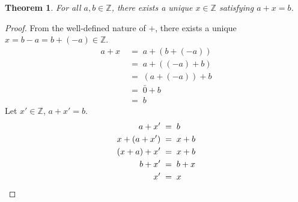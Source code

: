 \documentclass[10pt]{article}
\newtheorem{theorem}{Theorem}[section]
\theoremstyle{definition}
\theoremstyle{remark}
\newcommand{\Z}{\mathbb{Z}}
\begin{document}
        \begin{theorem}
                        For all $a, b \in \Z$, there exists a unique $x \in \Z$ satisfying $a + x = b$.
        \end{theorem}
        \begin{proof}
                From the well-defined nature of $+$, there exists a unique $x = b - a = b + (-a) \in \Z$.
                \begin{align*}
                        a + x \;&=\; a + (b + (-a)) \\
                                \;&=\; a + ((-a) + b) \\
                                \;&=\; (a + (-a)) + b \\
                                \;&=\; \bar{0} + b \\
                                \;&=\; b
                \end{align*}
                Let $x' \in \Z$, $a + x' = b$.
                \begin{align*}
                        a + x' \;&=\; b \\
                        x + (a + x') \;&=\; x + b \\
                        (x + a) + x' \;&=\; x + b \\
                        b + x' \;&=\; b + x \\
                        x' \;&=\; x \qedhere
                \end{align*}
        \end{proof}
\end{document}
